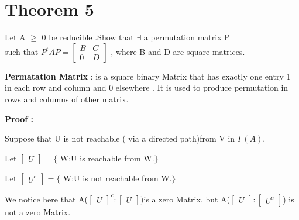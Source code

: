 \section*{Theorem 5}
 Let A $\geq$ 0 be reducible .Show that $\exists$ a permutation matrix P
 \\such that $ P^{t}AP =\begin{bmatrix}B&C\\0&D\end{bmatrix}$  , where B and D are square matrices.

{\bf Permatation Matrix }: is a square binary Matrix that has exactly one entry 1 in each row and column and 0 elsewhere .
It is used to produce permutation in rows and columns of other matrix.

{\bf Proof :}

Suppose that U is not reachable ( via a directed path)from V in $\Gamma(A)$.

Let 
$\begin{bmatrix}U\end{bmatrix}=\{$ W:U is reachable from W.$\}$

Let 
$\begin{bmatrix}U^{c}\end{bmatrix}=\{$ W:U is not reachable from W.$\}$

We notice here that A($\begin{bmatrix}U\end{bmatrix}^{c}:\begin{bmatrix}U\end{bmatrix})$is a zero Matrix,
but A($\begin{bmatrix}U\end{bmatrix} :\begin{bmatrix}U^{c}\end{bmatrix}$)  is not a zero Matrix.

